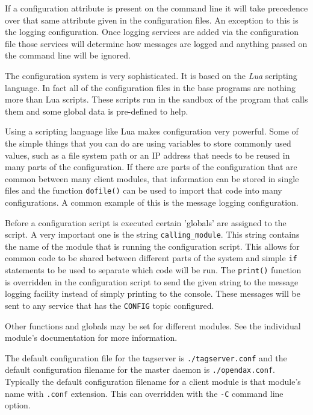	If a configuration attribute is present on the command line it will take
	precedence over that same attribute given in the configuration files.  An
	exception to this is the logging configuration.  Once logging services are added
	via the configuration file those services will determine how messages are logged
	and anything passed on the  command line will be ignored.
	
	The \opendax configuration system is very sophisticated.  It is based on the
	\textit{Lua} scripting language.  In fact all of the configuration files in the
	base \opendax programs are nothing more than Lua scripts.  These scripts run in
	the sandbox of the program that calls them and some global data is pre-defined
	to help.
	
	Using a scripting language like Lua makes configuration very powerful.  Some of
	the simple things that you can do are using variables to store commonly used
	values, such as a file system path or an IP address that needs to be reused in
	many parts of the configuration.  If there are parts of the configuration that
	are common between many client modules, that information can be stored in single
	files and the function \texttt{dofile()} can be used to import that code into
	many configurations.  A common example of this is the message logging
	configuration.
	
	Before a configuration script is executed certain 'globals' are assigned to the
	script.  A very important one is the string \texttt{calling\_module}.  This
	string contains the name of the module that is running the configuration script.
	This allows for common code to be shared between different parts of the system
	and simple \texttt{if} statements to be used to separate which code will be run.
	The \texttt{print()} function is overridden in the configuration script to send
	the given string to the message logging facility instead of simply printing to
	the console.  These messages will be sent to any service that has the
	\texttt{CONFIG} topic configured.
	
	Other functions and globals may be set for different modules.  See the
	individual module's documentation for more information.
	
	The default configuration file for the tagserver is \texttt{./tagserver.conf}
	and the default configuration filename for the master daemon is
	\texttt{./opendax.conf}.  Typically the default configuration filename for a
	client module is that module's name with \texttt{.conf} extension.  This can
	overridden with the \texttt{-C} command line option.
	
